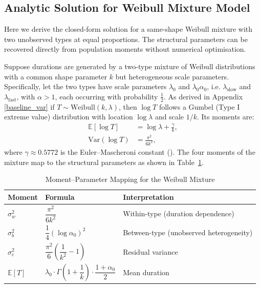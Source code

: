 \documentclass[12pt]{article}
\theoremstyle{definition}
\theoremstyle{remark}
\begin{document}
\begin{appendices}
\subsection{Analytic Solution for Weibull Mixture Model}
\label{weibull}
Here we derive the closed-form solution for a same-shape Weibull mixture with two unobserved types at equal proportions. The structural parameters can be recovered directly from population moments without numerical optimisation.


Suppose durations are generated by a two-type mixture of Weibull distributions with a common shape parameter $k$ but heterogeneous scale parameters. Specifically, let the two types have scale parameters $\lambda_0$ and $\lambda_0 \alpha_0$, i.e. $\lambda_{\text{slow}}$ and $\lambda_{\text{fast}}$, with $\alpha > 1$,  each occurring with probability $\frac{1}{2}$. As derived in Appendix \ref{baseline_var} if $T \sim \text{Weibull}(k, \lambda)$, then $\log T$ follows a Gumbel (Type I extreme value) distribution with location $\log \lambda$ and scale $1/k$. Its moments are:
\begin{align}
    \mathbb{E}[\log T] &= \log \lambda + \frac{\gamma}{k}, \label{eq:gumbel_mean} \\
    \text{Var}(\log T) &= \frac{\pi^2}{6k^2}, \label{eq:gumbel_var}
\end{align}
where $\gamma \approx 0.5772$ is the Euler--Mascheroni constant (\cite{johnson1994continuous}).
The four moments of the mixture map to the structural parameters as shown in Table~\ref{tab:moments}.

\begin{table}[htbp!]
\centering
\caption{Moment--Parameter Mapping for the Weibull Mixture}
\label{tab:moments}
\begin{tabular}{@{}lll@{}}
\toprule
Moment & Formula & Interpretation \\
\midrule
$\sigma^2_{w}$ & $\dfrac{\pi^2}{6k^2}$ & Within-type (duration dependence) \\[10pt]
$\sigma^2_{b}$ & $\dfrac{1}{4}\left(\log \alpha_0\right)^2$ & Between-type (unobserved heterogeneity) \\[10pt]
$\sigma^2_{e}$ & $\dfrac{\pi^2}{6}\!\left(\dfrac{1}{k^2} - 1\right)$ & Residual variance \\[10pt]
$\mathbb{E}[T]$ & $\lambda_0 \cdot \Gamma\!\left(1 + \dfrac{1}{k}\right) \cdot \dfrac{1 + \alpha_0}{2}$ & Mean duration \\[6pt]
\bottomrule
\end{tabular}
\end{table}




\end{appendices}
\end{document}
